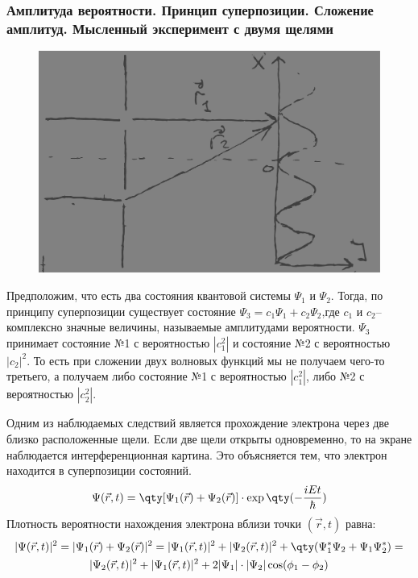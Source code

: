 \subsubsection{Амплитуда вероятности. Принцип суперпозиции. Сложение амплитуд. Мысленный эксперимент с двумя щелями}

\begin{figure}
\includegraphics[width=\linewidth]{fig/fig141}
\caption{}
\vspace{-17pt}
\end{figure}

Предположим, что есть два состояния квантовой системы $\Psi_1$ и $\Psi_2$.
Тогда, по принципу суперпозиции существует состояние $\Psi_3=c_1\Psi_1+c_2\Psi_2$,где
$c_1$ и  $c_2$-- комплексно значные величины, называемые амплитудами вероятности. $\Psi_3$ принимает состояние №1 с вероятностью $|c_1^2|$ и состояние №2 с вероятностью $|c_2|^2$. То есть при сложении двух волновых функций мы не получаем чего-то третьего, а получаем либо состояние №1 с вероятностью $|c_1^2|$, либо №2 с вероятностью $|c_2^2|$.

Одним из наблюдаемых следствий является прохождение электрона через две близко расположенные щели. Если две щели открыты одновременно, то на экране наблюдается интерференционная картина. Это объясняется тем, что электрон находится в суперпозиции состояний.
\begin{equation}
	\Psi(\vec{r},t)=\qty[\Psi_1(\vec{r})+\Psi_2(\vec{r})]\cdot\exp\qty(-\frac{iEt}{\hbar})
\end{equation}
Плотность вероятности нахождения электрона вблизи точки $(\vec{r},t)$ равна:
\begin{gather*}
	|\Psi(\vec{r},t)|^2=|\Psi_1(\vec{r})+\Psi_2(\vec{r})|^2=|\Psi_1(\vec{r},t)|^2+
	|\Psi_2(\vec{r},t)|^2+\qty(\Psi_1^*\Psi_2+\Psi_1\Psi_2^*)=\\
	|\Psi_2(\vec{r},t)|^2+|\Psi_1(\vec{r},t)|^2+2|\Psi_1|\cdot|\Psi_2|\cos(\phi_1-\phi_2)
\end{gather*}

